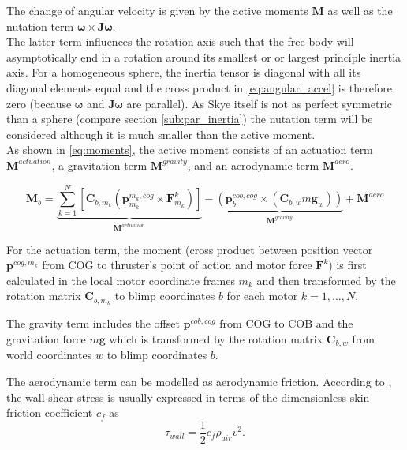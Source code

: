The change of angular velocity is given by the active moments $\mathbf{M}$ as well as the nutation term $\boldsymbol{\omega} \times \mathbf{J} \boldsymbol{\omega}$.
\\
The latter term influences the rotation axis such that the free body will asymptotically end in a rotation around its smallest or or largest principle inertia axis.
For a homogeneous sphere, the inertia tensor is diagonal with all its diagonal elements equal and the cross product in \eqref{eq:angular_accel} is therefore zero (because $\boldsymbol{\omega}$ and $\mathbf{J}\boldsymbol{\omega}$ are parallel).
As Skye itself is not as perfect symmetric than a sphere (compare section \ref{sub:par_inertia}) the nutation term will be considered although it is much smaller than the active moment.
\\
As shown in \eqref{eq:moments}, the active moment consists of an actuation term $\mathbf{M}^{actuation}$, a gravitation term $\mathbf{M}^{gravity}$, and an aerodynamic term $\mathbf{M}^{aero}$.

\begin{equation}
\label{eq:moments}
\mathbf{M}_b = \underbrace{\sum_{k=1}^N  \left[  \mathbf{C}_{b,m_k} \left( \mathbf{p}^{m_k,cog}_{m_k} \times \mathbf{F}^k_{m_k} \right)  \right]}_{\mathbf{M}^{actuation}}
-
\underbrace{
 \left( \mathbf{p}^{cob,cog}_b \times (\mathbf{C}_{b,w}m\mathbf{g}_w) \right)
}_{\mathbf{M}^{gravity}}
+
\mathbf{M}^{aero}
\end{equation}

For the actuation term, the moment
(cross product between position vector $\mathbf{p}^{cog,m_k}$ from COG to thruster's point of action and motor force $\mathbf{F}^k$)
is first calculated in the local motor coordinate frames $m_k$ and then transformed by the rotation matrix $\mathbf{C}_{b,m_k}$ to blimp coordinates $b$ for each motor $k=1,...,N$.

The gravity term includes the offset $\mathbf{p}^{cob,cog}$ from COG to COB and 
the gravitation force $m\mathbf{g}$ which is transformed by the rotation matrix $\mathbf{C}_{b,w}$ from world coordinates $w$ to blimp coordinates $b$.

The aerodynamic term can be modelled as aerodynamic friction. According to \citet{Kundu2012}, the wall shear stress is usually expressed in terms of the dimensionless skin friction coefficient $c_f$ as 
\begin{equation*}
\tau_{wall} = 
\frac{1}{2} c_f \rho_{air} v^2 .
\end{equation*}

